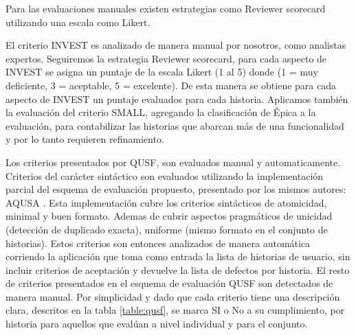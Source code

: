 Para las evaluaciones manuales existen estrategias como Reviewer scorecard utilizando una escala como Likert.

El criterio INVEST es analizado de manera manual por nosotros, como analistas expertos. Seguiremos la estrategia Reviewer scorecard, para cada aspecto de INVEST se asigna un puntaje de la escala Likert (1 al 5) donde (1 = muy deficiente, 3 = aceptable, 5 = excelente). De esta manera se obtiene para cada aspecto de INVEST un puntaje evaluados para cada historia.
Aplicamos también la evaluación del criterio SMALL, agregando la clasificación de Épica a la evaluación, para contabilizar las historias que abarcan más de una funcionalidad y por lo tanto requieren refinamiento.

Los criterios presentados por QUSF, son evaluados manual y automaticamente. Criterios del carácter sintáctico son evaluados utilizando la implementación parcial del esquema de evaluación propuesto, presentado por los mismos autores: AQUSA \cite{aqusa}.
Esta implementación cubre los criterios sintácticos de atomicidad, minimal y buen formato. Ademas de cubrir aspectos pragmáticos de unicidad (detección de duplicado exacta), uniforme (mismo formato en el conjunto de historias).
Estos criterios son entonces analizados de manera automática corriendo la aplicación que toma como entrada la lista de historias de usuario, sin incluir criterios de aceptación y devuelve la lista de defectos por historia.
El resto de criterios presentados en el esquema de evaluación QUSF son detectados de manera manual. Por simplicidad y dado que cada criterio tiene una descripción clara, descritos en la tabla \ref{table:qusf}, se marca SI o No a su cumplimiento, por historia para aquellos que evalúan a nivel individual y para el conjunto.

